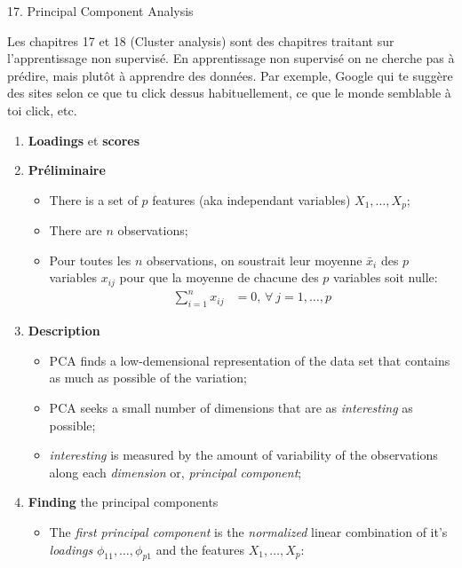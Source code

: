\documentclass[12pt, titlepage, french]{report}
\begin{document}
\begin{CHPT_SUMM}[label = {PCA-PCA}]{17. Principal Component Analysis}

Les chapitres 17 et 18 (Cluster analysis) sont des chapitres traitant sur l'apprentissage non supervisé. En apprentissage non supervisé on ne cherche pas à prédire, mais plutôt à apprendre des données. Par exemple, Google qui te suggère des sites selon ce que tu click dessus habituellement, ce que le monde semblable à toi click, etc.

\begin{enumerate}
	\item	\textbf{Loadings} et \textbf{scores}
	\item[]	\textbf{Préliminaire}
		\begin{itemize}
		\item	There is a set of $p$ features (aka independant variables) $X_{1}, \dots, X_{p}$;
		\item	There are $n$ observations;
		\item	Pour toutes les $n$ observations, on soustrait leur moyenne $\bar{x}_{i}$ des $p$ variables $x_{ij}$ pour que la moyenne de chacune des $p$ variables soit nulle:
			\begin{align*}
			\sum_{i = 1}^{n} x_{ij} &= 0, \, \forall \ j = 1, \dots, p
			\end{align*}
		\end{itemize}
	\item[]	\textbf{Description}
		\begin{itemize}
		\item	PCA finds a low-demensional representation of the data set that contains as much as possible of the variation;
		\item	PCA seeks a small number of dimensions that are as \textit{interesting} as possible;
		\item	\textit{interesting} is measured by the amount of variability of the observations along each \textit{dimension} or, \textit{principal component};
		\end{itemize}
	\item[]	\textbf{Finding} the principal components
		\begin{itemize}
		\item	The \textit{first principal component} is the \textit{normalized} linear combination of it's \textit{loadings} $\phi_{11}, \dots, \phi_{p1}$ and the features $X_{1}, \dots, X_{p}$:
			\begin{equation*}

\end{equation*}
\end{itemize}
\end{enumerate}
\end{CHPT_SUMM}
\end{document}
